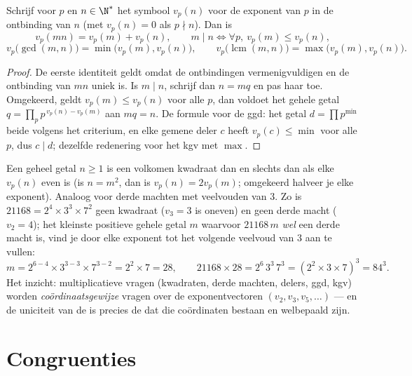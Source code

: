 \begin{proposition}[Waarderingen]\label{prop:b1:arith:valuation}
Schrijf voor $p$  en $n \in \N^*$ het symbool
$v_p(n)$ voor de
exponent van $p$ in de ontbinding van $n$ (met $v_p(n) = 0$ als $p \nmid
n$). Dan is
\[
v_p(mn) = v_p(m) + v_p(n),
\qquad
m \mid n \iff \forall p,\ v_p(m) \leq v_p(n),
\]
\[
v_p\bigl(\gcd(m,n)\bigr) = \min\bigl(v_p(m), v_p(n)\bigr),
\qquad
v_p\bigl(\operatorname{lcm}(m,n)\bigr) = \max\bigl(v_p(m),
v_p(n)\bigr).
\]
\end{proposition}

\begin{proof}
De eerste identiteit geldt omdat de ontbindingen vermenigvuldigen en de
ontbinding van $mn$ uniek is. Is $m \mid n$, schrijf dan $n = mq$ en pas
haar toe. Omgekeerd, geldt $v_p(m) \leq v_p(n)$ voor alle $p$, dan
voldoet het gehele getal $q = \prod_p p^{\,v_p(n) - v_p(m)}$ aan $mq =
n$. De formule voor de ggd: het getal $d = \prod p^{\min}$  beide
volgens het criterium, en elke gemene deler $c$ heeft $v_p(c) \leq \min$
voor alle $p$, dus $c \mid d$; dezelfde redenering voor het kgv met
$\max$.
\end{proof}

\begin{example}\label{ex:b1:arith:squarecube}
Een geheel getal $n \geq 1$ is een volkomen kwadraat dan en slechts dan
als elke $v_p(n)$ even is (is $n = m^2$, dan is $v_p(n) = 2v_p(m)$;
omgekeerd halveer je elke exponent). Analoog voor derde machten met
veelvouden van $3$. Zo is $21168 = 2^4 \times 3^3 \times 7^2$ geen
kwadraat ($v_3 = 3$ is oneven) en geen derde macht ($v_2 = 4$); het
kleinste positieve gehele getal $m$ waarvoor $21168\,m$ \emph{wel} een
derde macht is, vind je door elke exponent tot het volgende veelvoud van
$3$ aan te vullen:
\[
m = 2^{6-4} \times 3^{3-3} \times 7^{3-2} = 2^2 \times 7 = 28,
\qquad
21168 \times 28 = 2^6\,3^3\,7^3 = (2^2 \times 3 \times 7)^3
= 84^3 .
\]
Het inzicht: multiplicatieve vragen (kwadraten, derde machten, delers,
ggd, kgv) worden \emph{coördinaatsgewijze} vragen over de
exponentvectoren $(v_2, v_3, v_5, \dots)$ --- en de uniciteit van de
 is precies de  dat die coördinaten bestaan en
welbepaald zijn.
\end{example}

\section{Congruenties}

